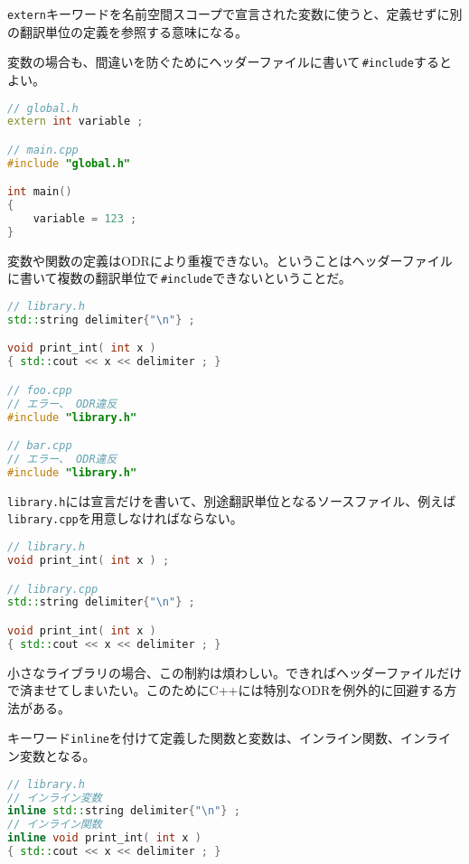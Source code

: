 \texttt{extern}キーワードを名前空間スコープで宣言された変数に使うと、定義せずに別の翻訳単位の定義を参照する意味になる。

変数の場合も、間違いを防ぐためにヘッダーファイルに書いて\,\texttt{\#include}するとよい。

\begin{lstlisting}[language={C++}]
// global.h
extern int variable ;

// main.cpp
#include "global.h"

int main()
{
    variable = 123 ;
}
\end{lstlisting}


変数や関数の定義はODRにより重複できない。ということはヘッダーファイルに書いて複数の翻訳単位で\,\texttt{\#include}できないということだ。

\begin{lstlisting}[language={C++}]
// library.h
std::string delimiter{"\n"} ;

void print_int( int x )
{ std::cout << x << delimiter ; }

// foo.cpp
// エラー、 ODR違反
#include "library.h"

// bar.cpp
// エラー、 ODR違反
#include "library.h"
\end{lstlisting}

\texttt{library.h}には宣言だけを書いて、別途翻訳単位となるソースファイル、例えば\texttt{library.cpp}を用意しなければならない。

\begin{lstlisting}[language={C++}]
// library.h
void print_int( int x ) ;

// library.cpp
std::string delimiter{"\n"} ;

void print_int( int x )
{ std::cout << x << delimiter ; }
\end{lstlisting}

小さなライブラリの場合、この制約は煩わしい。できればヘッダーファイルだけで済ませてしまいたい。このためにC++には特別なODRを例外的に回避する方法がある。

キーワード\texttt{inline}を付けて定義した関数と変数は、インライン関数、インライン変数となる。

\begin{lstlisting}[language={C++}]
// library.h
// インライン変数
inline std::string delimiter{"\n"} ;
// インライン関数
inline void print_int( int x )
{ std::cout << x << delimiter ; }
\end{lstlisting}

